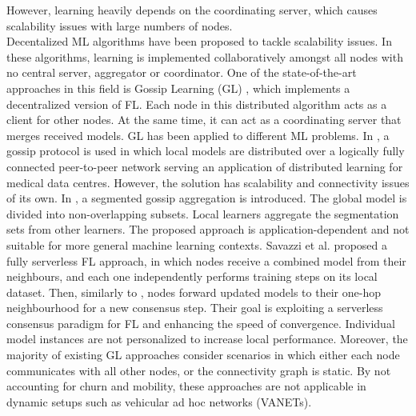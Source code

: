 However, learning heavily depends on the coordinating server, which causes scalability issues with large numbers of nodes. %
\\Decentalized ML algorithms have been proposed to tackle scalability issues. In these algorithms, learning is implemented collaboratively amongst all nodes with no central server, aggregator or coordinator. One of the state-of-the-art approaches in this field is Gossip Learning (GL) \cite{ormandi2013gossip}, which implements a decentralized version of FL. Each node in this distributed algorithm acts as a client for other nodes. At the same time, it can act as a coordinating server that merges received models. GL has been applied to different ML problems. In \cite{blot2016gossip}, a gossip protocol is used in which local models are distributed over a logically fully connected peer-to-peer network serving an application of distributed learning for medical data centres. However, the solution has scalability and connectivity issues of its own. In \cite{hu2019decentralized}, a segmented gossip aggregation is introduced. The global model is divided into non-overlapping subsets. Local learners aggregate the segmentation sets from other learners.  The proposed approach is application-dependent and not suitable for more general machine learning contexts. Savazzi et al.\cite{savazzi2020federated} proposed a fully serverless FL approach, in which nodes receive a combined model from their neighbours, and each one independently performs training steps on its local dataset. Then, similarly to \cite{blot2016gossip}, nodes forward updated models to their one-hop neighbourhood for a new consensus step. Their goal is exploiting a serverless consensus paradigm for FL and enhancing the speed of convergence. Individual model instances are not personalized to increase local performance. Moreover, the majority of existing GL approaches consider  scenarios  in  which  either each  node communicates with all other nodes, or the connectivity graph is  static. By not accounting for churn and mobility, these approaches are not applicable in dynamic setups such as vehicular ad hoc networks (VANETs).\\
